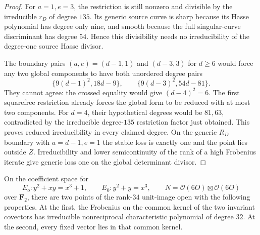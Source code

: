 \begin{proof}
For $a=1,e=3$, the restriction is still nonzero and divisible
by the irreducible $r_D$ of degree $135$. Its generic source
curve is sharp because its Hasse polynomial has degree only
nine, and smooth because the full singular-curve discriminant
has degree $54$. Hence this divisibility needs no irreducibility
of the degree-one source Hasse divisor.

The boundary pairs $(a,e)=(d-1,1)$ and $(d-3,3)$ for $d\ge6$
would force any two global components to have both unordered
degree pairs
\[
 \{9(d-1)^2,18d-9\},\qquad
 \{9(d-3)^2,54d-81\}.
\]
They cannot agree: the crossed equality would give
$(d-4)^2=6$. The first squarefree restriction already forces
the global form to be reduced with at most two components.
For $d=4$, their hypothetical degrees would be $81,63$,
contradicted by the irreducible degree-$135$ restriction
factor just obtained. This proves reduced irreducibility in
every claimed degree. On the generic $R_D$ boundary with
$a=d-1,e=1$ the stable loss is exactly one and the point lies
outside $Z$. Irreducibility and lower semicontinuity of the
rank of a high Frobenius iterate give generic loss one on
the global determinant divisor.
\end{proof}

\begin{lemma}
\label{lem:mixed-degree-two-certificate-candidate}
On the coefficient space for
\[
 E_o:y^2+xy=x^3+1,\qquad E_0:y^2+y=x^3,
 \qquad N=\mathcal O(6O)\boxtimes\mathcal O(6O)
\]
over $\mathbf F_2$, there are two points of the rank-$34$
unit-image open with the following properties. At the first,
the Frobenius on the common kernel of the two invariant
covectors has irreducible nonreciprocal characteristic
polynomial of degree $32$. At the second, every fixed vector
lies in that common kernel.
\end{lemma}

